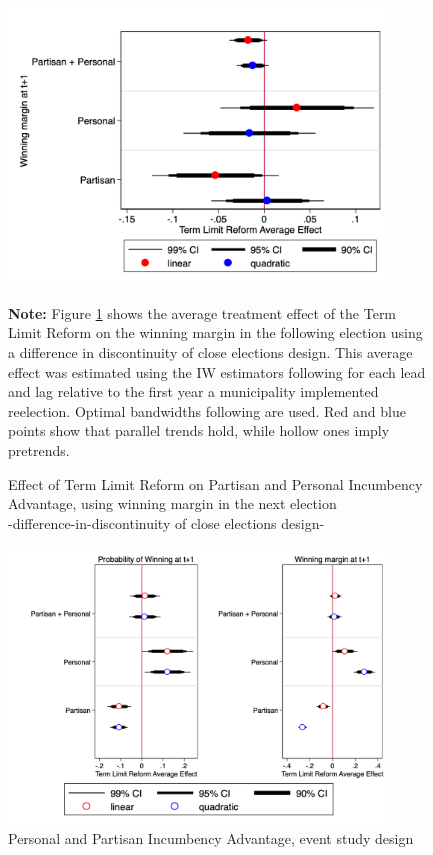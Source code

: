 \documentclass[12pt]{amsart}
\numberwithin{equation}{section}
\theoremstyle{definition}
\theoremstyle{definition}
\theoremstyle{definition}
\begin{document}
\begin{appendix}
\begin{figure}[h]   
\centering    
 \caption{Effect of Term Limit Reform on Partisan and Personal Incumbency Advantage, using winning margin in the next election \\ -difference-in-discontinuity of close elections design-}
 \label{fig:personal_vs_partisan_margin}
\includegraphics[width=0.9\textwidth]{../Figures_incumbency/partisan_personal_inc_advantage_margin.png}
       \captionsetup{justification=centering}
         
 \textbf{Note:} Figure \ref{fig:personal_vs_partisan_margin} shows the average treatment effect of the Term Limit Reform on the winning margin in the following election using a difference in discontinuity of close elections design. This average effect was estimated using the IW estimators following \citet{abraham_sun_2020} for each lead and lag relative to the first year a municipality implemented reelection. Optimal bandwidths following \citet{calonicoetal_2014} are used. Red and blue points show that parallel trends hold, while hollow ones imply pretrends. 
\end{figure}           

 \begin{figure}[h]   
\centering
 \caption{Personal and Partisan Incumbency Advantage, event study design}
 \label{fig:naive_partisan&personal}
 \includegraphics[width=0.9\textwidth]{../Figures_incumbency/naive_personalvspartisan_advantage.png}
 

\end{figure}
\end{appendix}
\end{document}
